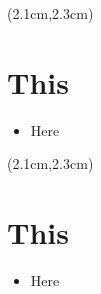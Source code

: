 \begin{preview}
\begin{textblock*}{5cm}(2.1cm,2.3cm) %
{\color{red}{\large \textcircled{\small \themypage}}}
\addtocounter{mypage}{1}
\end{textblock*}

\begin{minipage}{\textwidth}
\setlength{\parskip}{0.4\baselineskip}

\section{This}

\begin{itemize}
	\item Here
\end{itemize}

\end{minipage}
\end{preview}

\begin{preview}
\begin{textblock*}{5cm}(2.1cm,2.3cm) %
	{\color{red}{\large \textcircled{\small \themypage}}}
	\addtocounter{mypage}{1}
\end{textblock*}

\begin{minipage}{\textwidth}
	\setlength{\parskip}{0.4\baselineskip}

\section{This}

\begin{itemize}
	\item Here
\end{itemize}

\end{minipage}
\end{preview}


